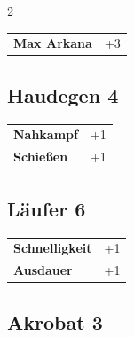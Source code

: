 \begin{multicols}{2}
\begin{tcolorbox}
\begin{tabular}{@{}ll@{}}
    \textbf{Max Arkana} & +3\\
\end{tabular}


\end{tcolorbox}

\begin{tcolorbox}
    \subsection*{Haudegen \hfill \small{4 }}
    \tcblower




\begin{tabular}{@{}ll@{}}
    \textbf{Nahkampf} & +1\\
    \textbf{Schießen} & +1\\
\end{tabular}


\end{tcolorbox}

\begin{tcolorbox}
    \subsection*{Läufer \hfill \small{6 }}
    \tcblower




\begin{tabular}{@{}ll@{}}
    \textbf{Schnelligkeit} & +1\\
    \textbf{Ausdauer} & +1\\
\end{tabular}


\end{tcolorbox}

\begin{tcolorbox}
    \subsection*{Akrobat \hfill \small{3 }}
    \tcblower





\end{tcolorbox}
\end{multicols}
